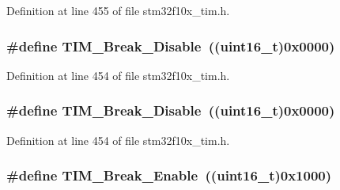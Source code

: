 Definition at line 455 of file stm32f10x\+\_\+tim.\+h.

\subsubsection[{\texorpdfstring{T\+I\+M\+\_\+\+Break\+\_\+\+Disable}{TIM_Break_Disable}}]{\setlength{\rightskip}{0pt plus 5cm}\#define T\+I\+M\+\_\+\+Break\+\_\+\+Disable~(({\bf uint16\+\_\+t})0x0000)}\hypertarget{group___break___input__enable__disable_ga31ba16dd70ad4d99adc911f7bf6662e5}{}\label{group___break___input__enable__disable_ga31ba16dd70ad4d99adc911f7bf6662e5}


Definition at line 454 of file stm32f10x\+\_\+tim.\+h.

\subsubsection[{\texorpdfstring{T\+I\+M\+\_\+\+Break\+\_\+\+Disable}{TIM_Break_Disable}}]{\setlength{\rightskip}{0pt plus 5cm}\#define T\+I\+M\+\_\+\+Break\+\_\+\+Disable~(({\bf uint16\+\_\+t})0x0000)}\hypertarget{group___break___input__enable__disable_ga31ba16dd70ad4d99adc911f7bf6662e5}{}\label{group___break___input__enable__disable_ga31ba16dd70ad4d99adc911f7bf6662e5}


Definition at line 454 of file stm32f10x\+\_\+tim.\+h.

\subsubsection[{\texorpdfstring{T\+I\+M\+\_\+\+Break\+\_\+\+Enable}{TIM_Break_Enable}}]{\setlength{\rightskip}{0pt plus 5cm}\#define T\+I\+M\+\_\+\+Break\+\_\+\+Enable~(({\bf uint16\+\_\+t})0x1000)}\hypertarget{group___break___input__enable__disable_gae7fbc11ac043454b2a880bffe98fdb8c}{}\label{group___break___input__enable__disable_gae7fbc11ac043454b2a880bffe98fdb8c}


